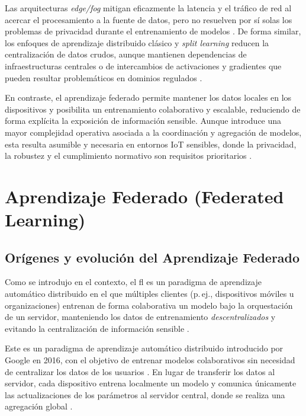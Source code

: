 \documentclass{report}
\begin{document}
Las arquitecturas \textit{edge/fog} mitigan eficazmente la latencia y el tráfico de red al acercar el procesamiento a la fuente de datos, pero no resuelven por sí solas los problemas de privacidad durante el entrenamiento de modelos \cite{shi2016edge,satyanarayanan2017emergence}. De forma similar, los enfoques de aprendizaje distribuido clásico y \textit{split learning} reducen la centralización de datos crudos, aunque mantienen dependencias de infraestructuras centrales o de intercambios de activaciones y gradientes que pueden resultar problemáticos en dominios regulados \cite{dean2012distbelief,li2014parameterserver,vepakomma2018splitnn,gupta2018split}.

En contraste, el aprendizaje federado permite mantener los datos locales en los dispositivos y posibilita un entrenamiento colaborativo y escalable, reduciendo de forma explícita la exposición de información sensible. Aunque introduce una mayor complejidad operativa asociada a la coordinación y agregación de modelos, esta resulta asumible y necesaria en entornos IoT sensibles, donde la privacidad, la robustez y el cumplimiento normativo son requisitos prioritarios \cite{mcmahan2017communication,kairouz2021advances}.


\section{Aprendizaje Federado (Federated Learning)}
\label{sec:fl}
\subsection{Orígenes y evolución del Aprendizaje Federado}
Como se introdujo en el contexto, el \gls{fl} es un paradigma de aprendizaje automático distribuido en el que múltiples clientes (p.\,ej., dispositivos móviles u organizaciones) entrenan de forma colaborativa un modelo bajo la orquestación de un servidor, manteniendo los datos de entrenamiento \emph{descentralizados} y evitando la centralización de información sensible \cite{mcmahan2017communication,kairouz2021advances}. 

Este es un paradigma de aprendizaje automático distribuido introducido por Google en 2016, con el objetivo de entrenar modelos colaborativos sin necesidad de centralizar los datos de los usuarios \cite{mcmahan2017communication}.  
En lugar de transferir los datos al servidor, cada dispositivo entrena localmente un modelo y comunica únicamente las actualizaciones de los parámetros al servidor central, donde se realiza una agregación global \cite{google2017federated}.  
\end{document}

